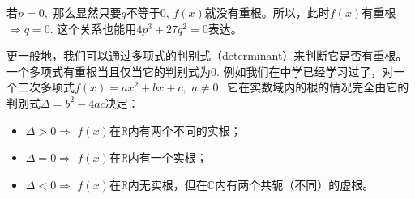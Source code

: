 若$p = 0,$ 那么显然只要$q$不等于0, $f(x)$就没有重根。所以，此时$f(x)$有重根$\Rightarrow q = 0.$ 这个关系也能用$4p^3 + 27q^2 = 0$表达。

\vspace{0.5em}

更一般地，我们可以通过多项式的判别式（determinant）来判断它是否有重根。一个多项式有重根当且仅当它的判别式为0. 例如我们在中学已经学习过了，对一个二次多项式$f(x) = ax^2 + bx + c,$ $a \neq 0,$ 它在实数域内的根的情况完全由它的判别式$\Delta = b^2 - 4ac$决定：
\begin{itemize}
\item $\Delta > 0 \Rightarrow$ $f(x)$在$\mathbb{R}$内有两个不同的实根；
\item $\Delta = 0 \Rightarrow$ $f(x)$在$\mathbb{R}$内有一个实根；
\item $\Delta < 0 \Rightarrow$ $f(x)$在$\mathbb{R}$内无实根，但在$\mathbb{C}$内有两个共轭（不同）的虚根。
\end{itemize}

